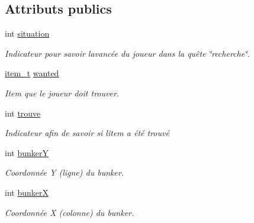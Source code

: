 \subsection*{Attributs publics}
\begin{DoxyCompactItemize}
\item 
\mbox{\label{structsearch__t_ab6f5e606c8085b8394d0985ceb27f163}} 
int \hyperlink{structsearch__t_ab6f5e606c8085b8394d0985ceb27f163}{situation}
\begin{DoxyCompactList}\small\item\em Indicateur pour savoir l\textquotesingle{}avancée du joueur dans la quête \char`\"{}recherche\char`\"{}. \end{DoxyCompactList}\item 
\mbox{\label{structsearch__t_ab2d79d72ccd04f94d3b887f6e5f0ec41}} 
\hyperlink{structitem__t}{item\+\_\+t} \hyperlink{structsearch__t_ab2d79d72ccd04f94d3b887f6e5f0ec41}{wanted}
\begin{DoxyCompactList}\small\item\em Item que le joueur doit trouver. \end{DoxyCompactList}\item 
\mbox{\label{structsearch__t_a2e6255a3d6a8618b8d727f933e6f2bb9}} 
int \hyperlink{structsearch__t_a2e6255a3d6a8618b8d727f933e6f2bb9}{trouve}
\begin{DoxyCompactList}\small\item\em Indicateur afin de savoir si l\textquotesingle{}item a été trouvé \end{DoxyCompactList}\item 
\mbox{\label{structsearch__t_a342257811026a1c17e7bc0c6b9726db3}} 
int \hyperlink{structsearch__t_a342257811026a1c17e7bc0c6b9726db3}{bunkerY}
\begin{DoxyCompactList}\small\item\em Coordonnée Y (ligne) du bunker. \end{DoxyCompactList}\item 
\mbox{\label{structsearch__t_ac7cd3467b5cbdc6904358de0523fe606}} 
int \hyperlink{structsearch__t_ac7cd3467b5cbdc6904358de0523fe606}{bunkerX}
\begin{DoxyCompactList}\small\item\em Coordonnée X (colonne) du bunker. \end{DoxyCompactList}\end{DoxyCompactItemize}


